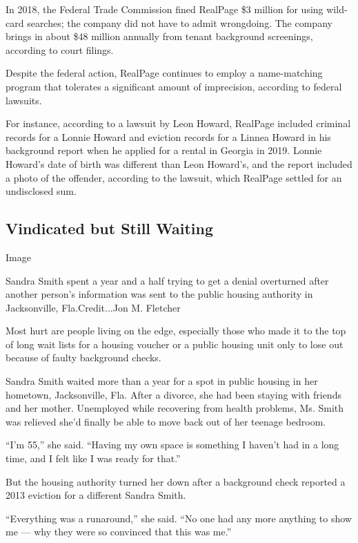 In 2018, the Federal Trade Commission fined RealPage \$3 million for
using wild-card searches; the company did not have to admit wrongdoing.
The company brings in about \$48 million annually from tenant background
screenings, according to court filings.

Despite the federal action, RealPage continues to employ a name-matching
program that tolerates a significant amount of imprecision, according to
federal lawsuits.

For instance, according to a lawsuit by Leon Howard, RealPage included
criminal records for a Lonnie Howard and eviction records for a Linnea
Howard in his background report when he applied for a rental in Georgia
in 2019. Lonnie Howard's date of birth was different than Leon Howard's,
and the report included a photo of the offender, according to the
lawsuit, which RealPage settled for an undisclosed sum.

\hypertarget{vindicated-but-still-waiting}{%
\subsection{Vindicated but Still
Waiting}\label{vindicated-but-still-waiting}}

Image

Sandra Smith spent a year and a half trying to get a denial overturned
after another person's information was sent to the public housing
authority in Jacksonville, Fla.Credit...Jon M. Fletcher

Most hurt are people living on the edge, especially those who made it to
the top of long wait lists for a housing voucher or a public housing
unit only to lose out because of faulty background checks.

Sandra Smith waited more than a year for a spot in public housing in her
hometown, Jacksonville, Fla. After a divorce, she had been staying with
friends and her mother. Unemployed while recovering from health
problems, Ms. Smith was relieved she'd finally be able to move back out
of her teenage bedroom.

``I'm 55,'' she said. ``Having my own space is something I haven't had
in a long time, and I felt like I was ready for that.''

But the housing authority turned her down after a background check
reported a 2013 eviction for a different Sandra Smith.

``Everything was a runaround,'' she said. ``No one had any more anything
to show me --- why they were so convinced that this was me.''

